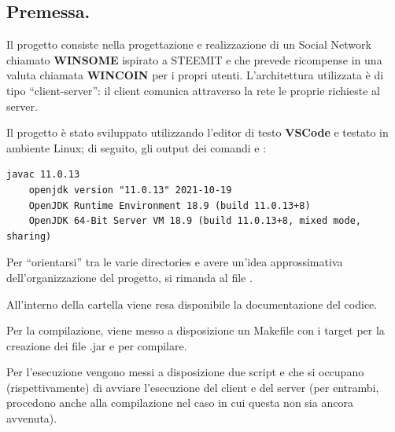 \documentclass[11pt, italian, openany]{book}
\begin{document}
\begin{sloppypar}
\subsection{Premessa.}
Il progetto consiste nella progettazione e realizzazione di un Social Network chiamato \textbf{WINSOME} ispirato a STEEMIT e che prevede
ricompense in una valuta chiamata \textbf{WINCOIN} per i propri utenti. L'architettura utilizzata \`e di tipo ``client-server'': il client
comunica attraverso la rete le proprie richieste al server.

Il progetto \`e stato sviluppato utilizzando l'editor di testo \textbf{VSCode} e testato in ambiente Linux; di seguito, gli output dei comandi
 e :
\begin{lstlisting}[style=code]
	javac 11.0.13
	openjdk version "11.0.13" 2021-10-19
	OpenJDK Runtime Environment 18.9 (build 11.0.13+8)
	OpenJDK 64-Bit Server VM 18.9 (build 11.0.13+8, mixed mode, sharing)
\end{lstlisting}
Per ``orientarsi'' tra le varie directories e avere un'idea approssimativa dell'organizzazione del progetto, si rimanda al file
.

All'interno della cartella  viene resa disponibile la documentazione del codice.

Per la compilazione, viene messo a disposizione un Makefile con i target  per la creazione dei file .jar e  per
compilare.

Per l'esecuzione vengono messi a disposizione due script  e  che si occupano (rispettivamente)
di avviare l'esecuzione del client e del server (per entrambi, procedono anche alla compilazione nel caso in cui questa non sia ancora
avvenuta).


\end{sloppypar}
\end{document}
